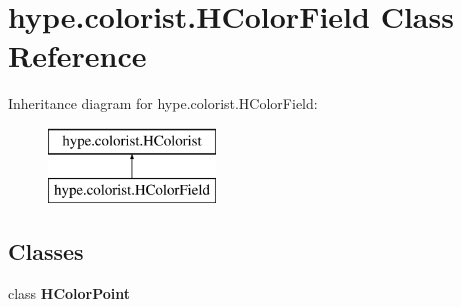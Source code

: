 \hypertarget{classhype_1_1colorist_1_1_h_color_field}{\section{hype.\-colorist.\-H\-Color\-Field Class Reference}
\label{classhype_1_1colorist_1_1_h_color_field}
}
Inheritance diagram for hype.\-colorist.\-H\-Color\-Field\-:\begin{figure}[H]
\begin{center}
\leavevmode
\includegraphics[height=2.000000cm]{classhype_1_1colorist_1_1_h_color_field}
\end{center}
\end{figure}
\subsection*{Classes}
\begin{DoxyCompactItemize}
\item 
class {\bfseries H\-Color\-Point}
\end{DoxyCompactItemize}
